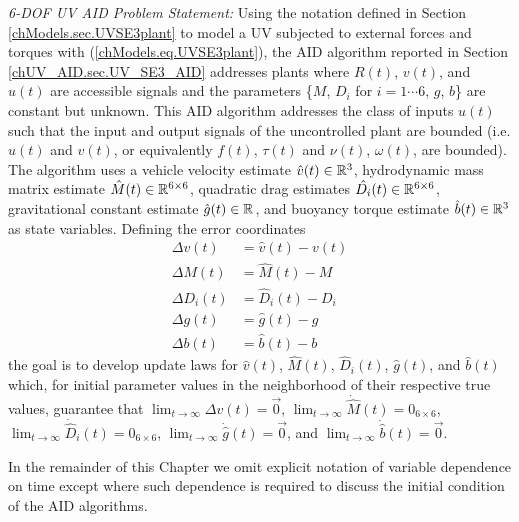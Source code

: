 
\vspace*{5mm} { \it 6-\ac{DOF} \ac{UV} \ac{AID} Problem Statement:}
Using the notation defined in Section \ref{chModels.sec.UVSE3plant} to
model a \ac{UV} subjected to external forces and torques with
(\ref{chModels.eq.UVSE3plant}), the \ac{AID} algorithm reported in
Section \ref{chUV_AID.sec.UV_SE3_AID} addresses plants where $R(t)$,
$v(t)$, and $u(t)$ are accessible signals and the parameters \{$M$,
$D_i$ for $i=1\cdots6$, $g$, $b$\} are constant but unknown.  This
\ac{AID} algorithm addresses the class of inputs $u(t)$ such that the
input and output signals of the uncontrolled plant are bounded
(i.e. $u(t)$ and $v(t)$, or equivalently $f(t)$, $\tau(t)$ and
$\nu(t)$, $\omega(t)$, are bounded). The algorithm uses a vehicle
velocity estimate $\hat{v}(t)\in \mathbb{R}^{3}$, hydrodynamic mass
matrix estimate $\hat{M}(t)\in\mathbb{R}^{6\times 6}$, quadratic drag
estimates $\hat{D_i}(t)\in\mathbb{R}^{6\times 6}$, gravitational
constant estimate $\hat{g}(t)\in\mathbb{R}^{} $, and buoyancy
torque estimate $\hat{b}(t)\in\mathbb{R}^{3}$ as state variables. Defining
the error coordinates
\begin{align}
\Delta v(t)&=\hat{v}(t)-v(t)                \label{chUV_AID.eq.deltav} \\
\Delta M(t)&=\hat{M}(t) - M                 \label{chUV_AID.eq.deltaM} \\
\Delta D_i(t)&=\hat{D}_i(t) - D_i            \label{chUV_AID.eq.deltaD} \\
\Delta g(t)&=\hat{g}(t) - g                 \label{chUV_AID.eq.deltag} \\
\Delta b(t)&=\hat{b}(t) - b                \label{chUV_AID.eq.deltabSE3} 
\end{align}
\noindent the goal is to develop update laws for $\hat{v}(t)$,
$\hat{M}(t)$, $\hat{D}_i(t)$, $\hat{g}(t)$, and $\hat{b}(t)$ which, for
initial parameter values in the neighborhood of their respective true
values, guarantee that $\lim_{t\to \infty}\Delta
v(t)=\vec{0}$, $\lim_{t\to \infty}\dot{\hat{M}}(t)=0_{6\times
  6}$, $\lim_{t\to \infty}\dot{\hat{D}}_i(t)=0_{6\times 6}$, $\lim_{t\to \infty}\dot{\hat{g}}(t)=\vec{0}$, and
$\lim_{t\to \infty}\dot{\hat{b}}(t)=\vec{0}$.

In the remainder of this Chapter we omit explicit notation of variable
dependence on time except where such dependence is required to discuss
the initial condition of the \ac{AID} algorithms.
